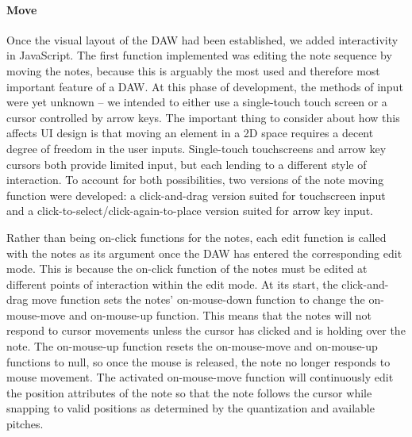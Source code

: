 \paragraph{Move}

Once the visual layout of the DAW had been established, we added interactivity in JavaScript. The
first function implemented was editing the note sequence by moving the notes, because this is
arguably the most used and therefore most important feature of a DAW. At this phase of development,
the methods of input were yet unknown -- we intended to either use a single-touch touch screen or a
cursor controlled by arrow keys. The important thing to consider about how this affects UI design
is that moving an element in a 2D space requires a decent degree of freedom in the user inputs.
Single-touch touchscreens and arrow key cursors both provide limited input, but each lending to a
different style of interaction. To account for both possibilities, two versions of the note moving
function were developed: a click-and-drag version suited for touchscreen input and a
click-to-select/click-again-to-place version suited for arrow key input.

Rather than being on-click functions for the notes, each edit function is called with the notes as
its argument once the DAW has entered the corresponding edit mode. This is because the on-click
function of the notes must be edited at different points of interaction within the edit mode. At
its start, the click-and-drag move function sets the notes' on-mouse-down function to change the
on-mouse-move and on-mouse-up function. This means that the notes will not respond to cursor
movements unless the cursor has clicked and is holding over the note. The on-mouse-up function
resets the on-mouse-move and on-mouse-up functions to null, so once the mouse is released, the note
no longer responds to mouse movement. The activated on-mouse-move function will continuously edit
the position attributes of the note so that the note follows the cursor while snapping to valid
positions as determined by the quantization and available pitches.


